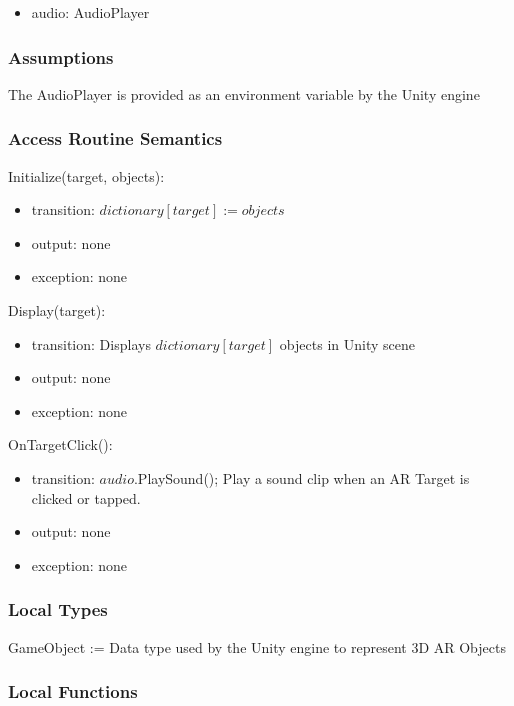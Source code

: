 \documentclass[12pt, titlepage]{article}
\begin{document}
\begin{itemize}
\item audio: AudioPlayer
\end{itemize}

\subsubsection{Assumptions}

The AudioPlayer is provided as an environment variable by the Unity engine

\subsubsection{Access Routine Semantics}

\noindent Initialize(target, objects):
\begin{itemize}
\item transition: $dictionary[target] := objects$
\item output: none
\item exception: none
\end{itemize}

\noindent Display(target):
\begin{itemize}
\item transition: Displays $dictionary[target]$ objects in Unity scene
\item output: none
\item exception: none
\end{itemize}

\noindent OnTargetClick():
\begin{itemize}
\item transition: $audio$.PlaySound(); Play a sound clip when an AR Target is clicked or tapped.
\item output: none
\item exception: none
\end{itemize}

\subsubsection{Local Types}

GameObject := Data type used by the Unity engine to represent 3D AR Objects

\subsubsection{Local Functions}
\end{document}
